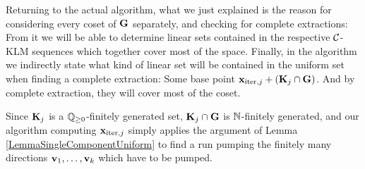 Returning to the actual algorithm, what we just explained is the reason for considering every coset of \(\mathbf{G}\) separately, and checking for complete extractions: From it we will be able to determine linear sets contained in the respective \(\mathcal{C}\)-KLM sequences which together cover most of the space. Finally, in the algorithm we indirectly state what kind of linear set will be contained in the uniform set when finding a complete extraction: Some base point \(\mathbf{x}_{\text{iter},j}+(\mathbf{K}_j \cap \mathbf{G})\). And by complete extraction, they will cover most of the coset.

Since \(\mathbf{K}_j\) is a \(\mathbb{Q}_{\geq 0}\)-finitely generated set, \(\mathbf{K}_j \cap \mathbf{G}\) is \(\mathbb{N}\)-finitely generated, and our algorithm computing \(\mathbf{x}_{\text{iter},j}\) simply applies the argument of Lemma \ref{LemmaSingleComponentUniform} to find a run pumping the finitely many directions \(\mathbf{v}_1, \dots, \mathbf{v}_k\) which have to be pumped.









































